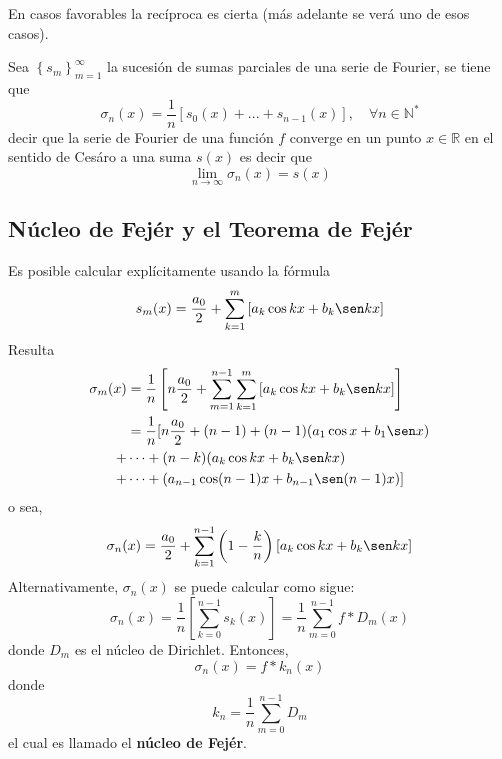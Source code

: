\documentclass[12pt]{report}
\theoremstyle{largebreak}
\begin{document}
    En casos favorables la recíproca es cierta (más adelante se verá uno de esos casos).

    Sea $\left\{s_m \right\}_{ m=1}^\infty$ la sucesión de sumas parciales de una serie de Fourier, se tiene que
    \begin{equation*}
        \sigma_n(x)=\frac{1}{n}\left[s_0(x)+...+s_{n-1}(x) \right],\quad\forall n\in\mathbb{N}^*
    \end{equation*}
    decir que la serie de Fourier de una función $f$ converge en un punto $x\in\mathbb{R}$ en el sentido de Cesáro a una suma $s(x)$ es decir que
    \begin{equation*}
        \lim_{ n\rightarrow\infty}\sigma_n(x)=s(x)
    \end{equation*}

    \subsection{Núcleo de Fejér y el Teorema de Fejér}

    Es posible calcular explícitamente usando la fórmula
    \begin{equation*}
        s_m(x)=\frac{a_0}{2}+\sum_{ k=1}^{m}\left[a_k\cos kx+b_k\sen kx \right]
    \end{equation*}
    Resulta
    \begin{equation*}
        \begin{split}
            \sigma_m(x)&=\frac{1}{n}\left[n\frac{a_0}{2}+\sum_{m=1}^{ n-1}\sum_{ k=1}^{m}\left[a_k\cos kx+b_k\sen kx \right] \right]\\
            &=\frac{1}{n}[n\frac{a_0}{2}+(n-1)+(n-1)(a_1\cos x+b_1\sen x)\\
            +&\cdots+(n-k)(a_k\cos kx+b_k\sen kx)\\
            +&\cdots+(a_{ n-1}\cos (n-1)x+b_{ n-1}\sen(n-1)x)]\\
        \end{split}
    \end{equation*}
    o sea,
    \begin{equation*}
        \sigma_n(x)=\frac{a_0}{2}+\sum_{ k=1}^{n-1}\left(1-\frac{k}{n} \right)\left[a_k\cos kx+b_k\sen kx \right]
    \end{equation*}
    Alternativamente, $\sigma_n(x)$ se puede calcular como sigue:
    \begin{equation*}
        \sigma_n(x)=\frac{1}{n}\left[\sum_{ k=0}^{ n-1}s_k(x) \right]=\frac{1}{n}\sum_{ m=0}^{ n-1}f*D_m(x)
    \end{equation*}
    donde $D_m$ es el núcleo de Dirichlet. Entonces,
    \begin{equation*}
        \sigma_n(x)=f*k_n(x)
    \end{equation*}
    donde
    \begin{equation*}
        k_n=\frac{1}{n}\sum_{ m=0}^{ n-1}D_m
    \end{equation*}
    el cual es llamado el \textbf{núcleo de Fejér}.
\end{document}
